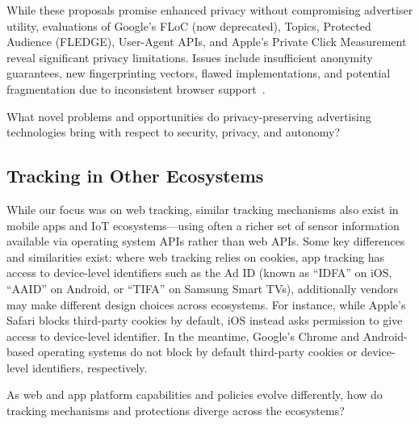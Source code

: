 While these proposals promise enhanced privacy without compromising advertiser utility, evaluations of Google's FLoC (now deprecated)\cite{rescorlaTechnicalCommentsFLoC2021,berkePrivacyLimitationsInterestbased2022,turatiLocalitySensitiveHashingDoes2023}, Topics\cite{thomsonPrivacyAnalysisGoogles2023,jhaRobustnessTopicsAPI2023,beuginInterestdisclosingMechanismsAdvertising2024,beuginPublicReproducibleAssessment2024,alvimPrivacyUtilityTradeoffTopics2024}, Protected Audience (FLEDGE)\cite{thomsonProtectedAudiencePrivacy2024,longEvaluatingGooglesProtected2024,calderonioFledgingWillContinue2024}, User-Agent APIs\cite{senolUnveilingImpactUserAgent2023,intumwayaseUARadarExploringImpact2023}, and Apple's Private Click Measurement~\cite{thomsonAnalysisApplesPrivate2022} reveal significant privacy limitations. Issues include insufficient anonymity guarantees, new fingerprinting vectors, flawed implementations, and potential fragmentation due to inconsistent browser support~\cite{munirGooglesChromeAntitrust2024}.

\begin{opbox}
What novel problems and opportunities do privacy-preserving advertising technologies bring with respect to security, privacy, and autonomy?
\end{opbox}



\subsection{Tracking in Other Ecosystems}
While our focus was on web tracking, similar tracking mechanisms also exist in mobile apps and IoT ecosystems---using often a richer set of sensor information available via operating system APIs rather than web APIs. Some key differences and similarities exist: where web tracking relies on cookies, app tracking has access to device-level identifiers such as the Ad ID (known as ``IDFA'' on iOS, ``AAID'' on Android, or ``TIFA'' on Samsung Smart TVs), additionally vendors may make different design choices across ecosystems. For instance, while Apple's Safari blocks third-party cookies by default, iOS instead asks permission  to give access to device-level identifier. In the meantime, Google's Chrome and Android-based operating systems do not block by default third-party cookies or device-level identifiers, respectively. 

\begin{opbox}
As web and app platform capabilities and policies evolve differently, how do tracking mechanisms and protections diverge across the ecosystems? 
\end{opbox}

